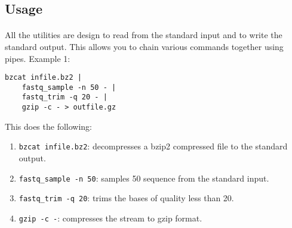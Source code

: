 \documentclass[a4paper,12pt]{article}
\begin{document}

\subsection{Usage}

\paragraph{}
All the utilities are design to read from the standard input and to write the
standard output.
This allows you to chain various commands together using pipes.
Example 1:
\begin{verbatim}
bzcat infile.bz2 |
    fastq_sample -n 50 - |
    fastq_trim -q 20 - |
    gzip -c - > outfile.gz
\end{verbatim}
This does the following:
\begin{enumerate}
    \item \texttt{bzcat infile.bz2}: decompresses a bzip2 compressed file to
        the standard output.
    \item \texttt{fastq\_sample -n 50}: samples 50 sequence from the standard
        input.
    \item \texttt{fastq\_trim -q 20}: trims the bases of quality less than 20.
    \item \texttt{gzip -c -}: compresses the stream to gzip format.
\end{enumerate}
\end{document}
